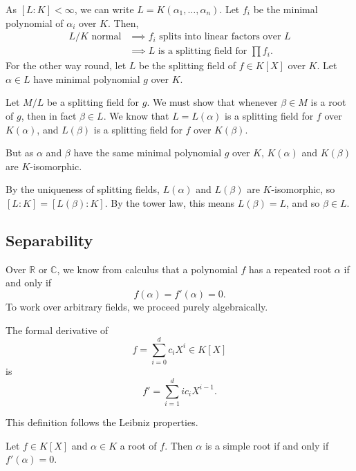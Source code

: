 \documentclass[12pt]{article}
\begin{document}
\begin{proofbox}
	As $[L:K] < \infty$, we can write $L = K(\alpha_1, \ldots, \alpha_n)$. Let $f_i$ be the minimal polynomial of $\alpha_i$ over $K$. Then,
	\begin{align*}
		L/K \text{ normal} &\implies f_i \text{ splits into linear factors over } L \\
				   &\implies L \text{ is a splitting field for } \prod f_i.
	\end{align*}
	For the other way round, let $L$ be the splitting field of $f \in K[X]$ over $K$. Let $\alpha \in L$ have minimal polynomial $g$ over $K$.

	Let $M/L$ be a splitting field for $g$. We must show that whenever $\beta \in M$ is a root of $g$, then in fact $\beta \in L$. We know that $L = L(\alpha)$ is a splitting field for $f$ over $K(\alpha)$, and $L(\beta)$ is a splitting field for $f$ over $K(\beta)$.

	But as $\alpha$ and $\beta$ have the same minimal polynomial $g$ over $K$, $K(\alpha)$ and $K(\beta)$ are $K$-isomorphic.

	By the uniqueness of splitting fields, $L(\alpha)$ and $L(\beta)$ are $K$-isomorphic, so $[L:K] = [L(\beta):K]$. By the tower law, this means $L(\beta) = L$, and so $\beta \in L$.
\end{proofbox}


\subsection{Separability}
\label{sub:separability}

Over $\mathbb{R}$ or $\mathbb{C}$, we know from calculus that a polynomial $f$ has a repeated root $\alpha$ if and only if
\[
f(\alpha) = f'(\alpha) = 0.
\]
To work over arbitrary fields, we proceed purely algebraically.

\begin{definition}
	The formal derivative of
	\[
		f = \sum_{i = 0}^{d} c_i X^i \in K[X]
	\]
	is
	\[
	f' = \sum_{i = 1}^{d} i c_i X^{i-1}.
	\]
\end{definition}

This definition follows the Leibniz properties.

\begin{lemma}
	Let $f \in K[X]$ and $\alpha \in K$ a root of $f$. Then $\alpha$ is a simple root if and only if $f'(\alpha) = 0$.
\end{lemma}
\end{document}
